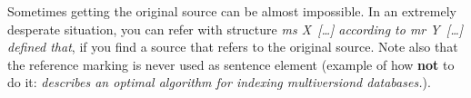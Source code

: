 Sometimes getting the original source can be almost impossible. In an
extremely desperate situation, you can refer with structure \emph{ms
  X~[\ldots] according to mr Y~[\ldots] defined that}, if you find a
source that refers to the original source. Note also that the
reference marking is never used as sentence element (example of how 
\textbf{not} to do it: \emph{ describes
an optimal algorithm for indexing multiversiond databases.}).



















